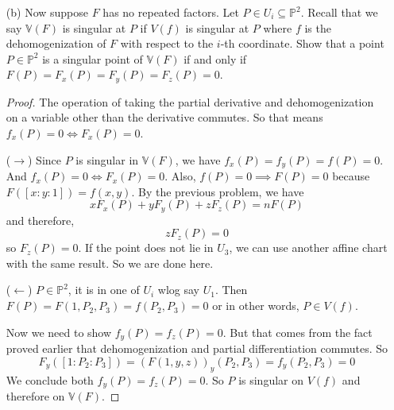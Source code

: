 \documentclass{article}
\begin{document}
\begin{itemize}
        \item [(b)] Now suppose $F$ has no repeated factors. Let $P \in U_{i} \subseteq \mathbb{P}^{2}$. Recall that we say $\mathbb{V}(F)$ is singular at $P$ if $V(f)$ is singular at $P$ where $f$ is the dehomogenization of $F$ with respect to the $i$-th coordinate. Show that a point $P \in \mathbb{P}^{2}$ is a singular point of $\mathbb{V}(F)$ if and only if $F(P) = F_{x}(P) = F_{y}(P) = F_{z}(P) = 0$.
            \begin{proof}
                The operation of taking the partial derivative and dehomogenization on a variable other than the derivative commutes. So that means $f_{x}(P) = 0 \iff  F_{ x}(P) = 0$.

                ($\rightarrow$) Since $P$ is singular in $\mathbb{V}(F)$, we have $f_{x}(P) = f_{y}(P) = f(P) = 0$. And $f_{x}(P) = 0 \iff F_{ x}(P) = 0$. Also, $f(P) = 0 \implies F( P) = 0$ because $F([x: y: 1]) = f(x, y)$. By the previous problem, we have
                    \begin{equation*}
                        xF_{x}(P) + yF_{y}(P) + zF_{z}(P) = nF(P)
                    \end{equation*}
                and therefore,
                    \begin{equation*}
                        zF_{z}(P) = 0
                    \end{equation*}
                so $F_{z}(P) = 0$. If the point does not lie in $U_{3}$, we can use another affine chart with the same result. So we are done here.

                ($\leftarrow$) $P \in \mathbb{ P}^{2}$, it is in one of $U_{i}$ wlog say $U_{1}$. Then $F(P) = F(1, P_{2}, P_{3}) = f(P_{2}, P_{3}) = 0$ or in other words, $P \in V( f)$. 

                Now we need to show $f_{y}(P) = f_{z}(P) = 0$. But that comes from the fact proved earlier that dehomogenization and partial differentiation commutes. So 
                    \begin{equation*}
                        F_{y}([1 : P_{2}: P_{3}]) = (F(1, y, z))_{y}(P_{2}, P_{3}) = f_{y}(P_{2}, P_{3}) = 0
                    \end{equation*}
                We conclude both $f_{y}(P) = f_{z}(P) = 0$. So $P$ is singular on $V(f)$ and therefore on $\mathbb{V}(F)$.
            \end{proof}


\end{itemize}
\end{document}
